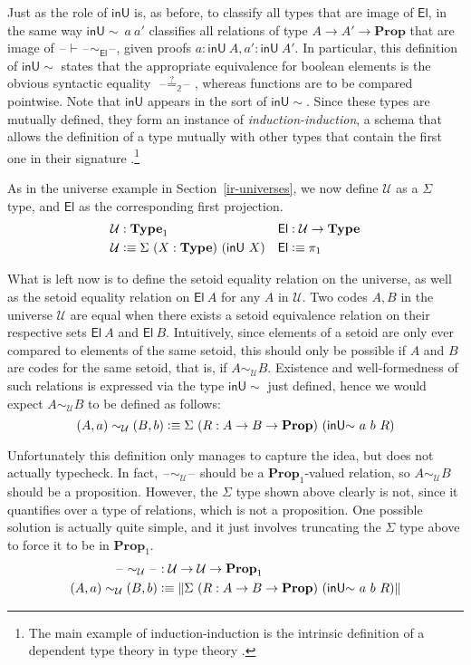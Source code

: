 \documentclass[autoref]{llncs}
\newcommand{\setoidU}{\mathcal{U}}
\newcommand{\inU}{\mathsf{inU}}
\newcommand{\inUU}{\mathsf{inU{\sim}}}
\newcommand{\mType}{\mathbf{Type}}
\newcommand{\mProp}{\mathbf{Prop}}
\newcommand{\El}{\textsf{El}}
\providecommand\mathbbm{\mathbb}
\newcommand{\blank}{\mathord{\hspace{1pt}\text{--}\hspace{1pt}}}
\newcommand{\defeq}{\mathrel{\vcentcolon\equiv}}
\begin{document}
Just as the role of $\inU$ is, as before, to classify all types that are image
of $\El$, in the same way $\inUU\ a\ a'$ classifies all relations of type $A \to
A' \to \mProp$ that are image of $\blank\vdash\blank\sim_{\El}\blank$, given proofs $a :
\inU\ A, a' : \inU\ A'$.
%
In particular, this definition of $\inUU$ states that the appropriate
equivalence for boolean elements is the obvious syntactic equality
$\blank\stackrel{?}{=}_{\mathbbm{2}}\blank$, whereas functions are to be compared
pointwise.
%
Note that $\inU$ appears in the sort of $\inUU$. Since these types are
mutually defined, they form an instance of \emph{induction-induction}, a schema
that allows the definition of a type mutually with other types that contain the
first one in their signature \cite{ii}.\footnote{The main example of
  induction-induction is the intrinsic definition of a dependent type theory in
  type theory \cite{tt-in-tt}.}

As in the universe example in Section~\ref{ir-universes}, we now define
$\setoidU$ as a $\Sigma$ type, and $\El$ as the corresponding first projection.
{\small\vspace{-0.2em}
\begin{align*}
  \setoidU & : \mType_1 & \El &: \setoidU \to \mType \\
  \setoidU & \defeq \Sigma\ (X : \mType)\ (\inU\ X) & \El &\defeq \pi_1
\end{align*}}\vspace{-1em}

What is left now is to define the setoid equality relation on the universe, as
well as the setoid equality relation on $\El\ A$ for any $A$ in $\setoidU$.
%
Two codes $A, B$ in the universe $\setoidU$ are equal when there exists a setoid
equivalence relation on their respective sets $\El\ A$ and $\El\ B$. Intuitively,
since elements of a setoid are only ever compared to elements of the same
setoid, this should only be possible if $A$ and $B$ are codes for the same setoid,
that is, if $A \sim_{\setoidU} B$. Existence and well-formedness of such
relations is expressed via the type $\inUU$ just defined, hence we would
expect $A \sim_{\setoidU} B$ to be defined as follows:
\[
(A, a) \sim_{\setoidU} (B, b) \defeq \Sigma\ (R: A \to B \to \mProp)\ (\inUU\ a\ b\ R)
\]

Unfortunately this definition only manages to capture the idea, but does not
actually typecheck. In fact, $\blank\sim_{\setoidU}\blank$ should be a $\mProp_1$-valued
relation, so $A \sim_{\setoidU} B$ should be a proposition. However, the
$\Sigma$ type shown above clearly is not, since it quantifies over a type of
relations, which is not a proposition.
%
One possible solution is actually quite simple, and it just involves truncating
the $\Sigma$ type above to force it to be in $\mProp_1$.
{\small\vspace{-0.2em}
\begin{align*}
  \blank\sim_{\setoidU}\blank &: \setoidU \to \setoidU \to \mProp_1 \\
  (A , a) \sim_{\setoidU} (B , b) &\defeq
   \| \Sigma\ (R : A \to B \to \mProp)\ (\inUU\ a\ b\ R) \|
\end{align*}}\vspace{-1em}
\end{document}
